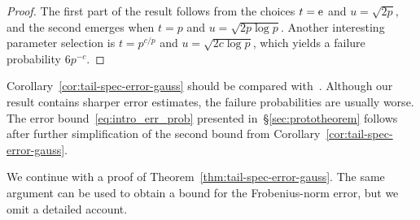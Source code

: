 \documentclass[final]{siamltex}
\newcommand{\pgnotate}[1]{{\color{blue}[#1]}}
\begin{document}
\lsp

\begin{proof}
The first part of the result follows from the choices
$t = \mathrm{e}$ and $u = \sqrt{2p}$, and the second
emerges when $t = p$ and $u = \sqrt{2p\log p}$.
Another interesting parameter selection is
$t = p^{c/p}$ and $u = \sqrt{2c\log p}$,
which yields a failure probability $6p^{-c}$.
\end{proof}

\lsp

Corollary~\ref{cor:tail-spec-error-gauss} should be compared with~\cite[Obs.~4.4--4.5]{random1}.
Although our result contains sharper error estimates,
the failure probabilities are usually worse.
The error bound~\eqref{eq:intro_err_prob} presented in~\S\ref{sec:prototheorem}
follows after further simplification of the second bound from Corollary~\ref{cor:tail-spec-error-gauss}.





We continue with a proof of Theorem~\ref{thm:tail-spec-error-gauss}.
The same argument can be used to obtain a bound for the
Frobenius-norm error, but we omit a detailed account.

\lsp
\end{document}
